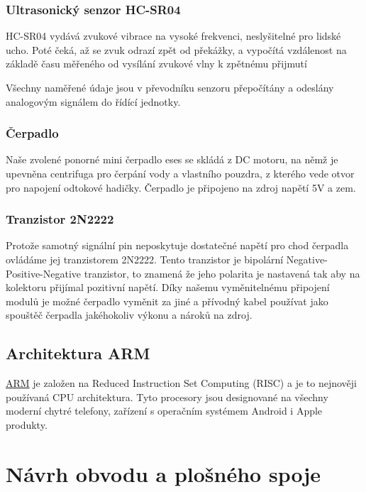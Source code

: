 \documentclass[12pt,a4paper]{article}
\begin{document}
\subsubsection{Ultrasonický senzor HC-SR04}

\ac{HC-SR04} vydává zvukové vibrace na vysoké frekvenci, neslyšitelné pro lidské ucho. Poté čeká, až se zvuk odrazí zpět od překážky, a vypočítá vzdálenost na základě času měřeného od vysílání zvukové vlny k zpětnému přijmutí

Všechny naměřené údaje jsou v převodníku senzoru přepočítány a odeslány analogovým signálem do řídící jednotky.

\subsubsection{Čerpadlo}

Naše zvolené ponorné mini čerpadlo eses se skládá z DC motoru, na němž je upevněna centrifuga pro čerpání vody a vlastního pouzdra, z kterého vede otvor pro napojení odtokové hadičky. Čerpadlo je připojeno na zdroj napětí 5V a zem.

\subsubsection{Tranzistor 2N2222}

Protože samotný signální pin neposkytuje dostatečné napětí pro chod čerpadla ovládáme jej tranzistorem 2N2222. Tento tranzistor je bipolární Negative-Positive-Negative tranzistor, to znamená že jeho polarita je nastavená tak aby na kolektoru přijímal pozitivní napětí. Díky našemu vyměnitelnému připojení modulů je možné čerpadlo vyměnit za jiné a přívodný kabel používat jako spouštěč čerpadla jakéhokoliv výkonu a nároků na zdroj.

\subsection{Architektura ARM}

\underline{\ac{ARM}} je založen na Reduced Instruction Set Computing (RISC) a je to nejnověji používaná CPU architektura. Tyto procesory jsou designované na všechny moderní chytré telefony, zařízení s operačním systémem Android i Apple produkty.

\clearpage

\section{Návrh obvodu a plošného spoje}
\end{document}
